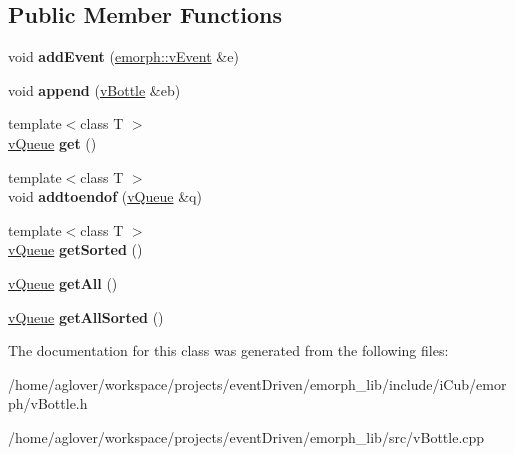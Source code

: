 \subsection*{Public Member Functions}
\begin{DoxyCompactItemize}
\item 
\hypertarget{classemorph_1_1vBottle_ae4fd194765da088246c407b6c09e336e}{void {\bfseries add\-Event} (\hyperlink{classemorph_1_1vEvent}{emorph\-::v\-Event} \&e)}\label{classemorph_1_1vBottle_ae4fd194765da088246c407b6c09e336e}

\item 
\hypertarget{classemorph_1_1vBottle_a94d820ff09717296c38dd8e4ea3e7a15}{void {\bfseries append} (\hyperlink{classemorph_1_1vBottle}{v\-Bottle} \&eb)}\label{classemorph_1_1vBottle_a94d820ff09717296c38dd8e4ea3e7a15}

\item 
\hypertarget{classemorph_1_1vBottle_a51d19e24f9087a4123f5ef7650ac777a}{{\footnotesize template$<$class T $>$ }\\\hyperlink{classemorph_1_1vQueue}{v\-Queue} {\bfseries get} ()}\label{classemorph_1_1vBottle_a51d19e24f9087a4123f5ef7650ac777a}

\item 
\hypertarget{classemorph_1_1vBottle_af8006479b9ef748f0ff6e441284a46c7}{{\footnotesize template$<$class T $>$ }\\void {\bfseries addtoendof} (\hyperlink{classemorph_1_1vQueue}{v\-Queue} \&q)}\label{classemorph_1_1vBottle_af8006479b9ef748f0ff6e441284a46c7}

\item 
\hypertarget{classemorph_1_1vBottle_a450019145cdb646901e4f5ac46a9f72e}{{\footnotesize template$<$class T $>$ }\\\hyperlink{classemorph_1_1vQueue}{v\-Queue} {\bfseries get\-Sorted} ()}\label{classemorph_1_1vBottle_a450019145cdb646901e4f5ac46a9f72e}

\item 
\hypertarget{classemorph_1_1vBottle_a1820eeaa7576d0f7bcf0de6420d40435}{\hyperlink{classemorph_1_1vQueue}{v\-Queue} {\bfseries get\-All} ()}\label{classemorph_1_1vBottle_a1820eeaa7576d0f7bcf0de6420d40435}

\item 
\hypertarget{classemorph_1_1vBottle_af4df9387ad493ec4451e1f5c2232ce0b}{\hyperlink{classemorph_1_1vQueue}{v\-Queue} {\bfseries get\-All\-Sorted} ()}\label{classemorph_1_1vBottle_af4df9387ad493ec4451e1f5c2232ce0b}

\end{DoxyCompactItemize}


The documentation for this class was generated from the following files\-:\begin{DoxyCompactItemize}
\item 
/home/aglover/workspace/projects/event\-Driven/emorph\-\_\-lib/include/i\-Cub/emorph/v\-Bottle.\-h\item 
/home/aglover/workspace/projects/event\-Driven/emorph\-\_\-lib/src/v\-Bottle.\-cpp\end{DoxyCompactItemize}
